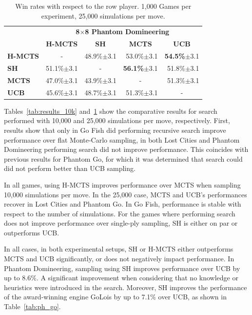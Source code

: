 \documentclass[a4paper]{llncs}
\begin{document}
\begin{table}[ht]
\begin{tabular}{@{}lrrrr@{}}
\toprule
& \multicolumn{4}{c}{\textbf{8$\times$8 Phantom Domineering}}       \\
& \multicolumn{1}{c}{\textbf{H-MCTS}} & \multicolumn{1}{c}{\textbf{SH}} & \multicolumn{1}{c}{\textbf{MCTS}} & \multicolumn{1}{c}{\textbf{UCB}} \\ [1mm] \cmidrule(l){2-5} 
\textbf{H-MCTS} & \multicolumn{1}{c}{-}		& 48.9\%$\pm$3.1			& 53.0\%$\pm$3.1 			& \textbf{54.5\%}$\pm$3.1 		\\[.5mm] 
\textbf{SH}     & 51.1\%$\pm$3.1			& \multicolumn{1}{c}{-}		& \textbf{56.1\%}$\pm$3.1	& 51.8\%$\pm$3.1		 		\\[.5mm] 
\textbf{MCTS}   & 47.0\%$\pm$3.1			& 43.9\%$\pm$3.1			& \multicolumn{1}{c}{-} 	& 51.3\%$\pm$3.1  				\\[.5mm] 
\textbf{UCB}	& 45.6\%$\pm$3.1			& 48.7\%$\pm$3.1			& 51.3\%$\pm$3.1			& \multicolumn{1}{c}{-} 		\\[.5mm] \bottomrule
\end{tabular}

\vspace{2mm}
{\caption{Win rates with respect to the row player. 1,000 Games per experiment, 25,000 simulations per move.} \label{tab:results_25k}}
\end{table}

Tables~\ref{tab:results_10k} and~\ref{tab:results_25k} show the comparative results for search performed with 10,000 and 25,000 simulations per move, respectively. First, results show that only in Go Fish did performing recursive search improve performance over flat Monte-Carlo sampling, in both Lost Cities and Phantom Domineering performing search did not improve performance. This coincides with previous results for Phantom Go, for which it was determined that search could did not perform better than UCB sampling. 

In all games, using H-MCTS improves performance over MCTS when sampling 10,000 simulations per move. In the 25,000 case, MCTS and UCB's performances recover in Lost Cities and Phantom Go. In Go Fish, performance is stable with respect to the number of simulations. For the games where performing search does not improve performance over single-ply sampling, SH is either on par or outperforms UCB.

In all cases, in both experimental setups, SH or H-MCTS either outperforms MCTS and UCB significantly, or does not negatively impact performance. In Phantom Domineering, sampling using SH improves performance over UCB by up to 8.6\%. A significant improvement when considering that no knowledge or heuristics were introduced in the search. Moreover, SH improves the performance of the award-winning engine {\sc GoLois} by up to 7.1\% over UCB, as shown in Table~\ref{tab:ph_go}.
\end{document}
